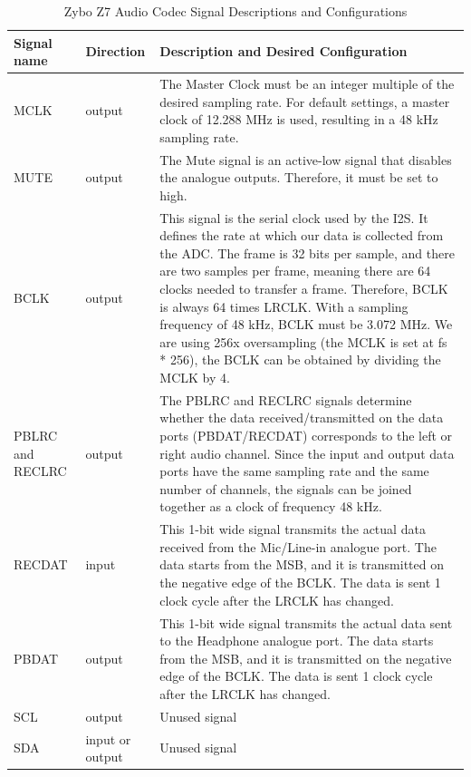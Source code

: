 \begin{table}
    \centering
    \begin{tabular}{|p{1.5cm}|p{1.5cm}|p{12cm}|}
        \hline
        \textbf{Signal name} & \textbf{Direction} & \textbf{Description and Desired Configuration} \\
        \hline
        MCLK & output & The Master Clock must be an integer multiple of the desired sampling rate. For default settings, a master clock of 12.288 MHz is used, resulting in a 48 kHz sampling rate. \\
        \hline
        MUTE & output & The Mute signal is an active-low signal that disables the analogue outputs. Therefore, it must be set to high. \\
        \hline
        BCLK & output & This signal is the serial clock used by the I2S. It defines the rate at which our data is collected from the ADC. The frame is 32 bits per sample, and there are two samples per frame, meaning there are 64 clocks needed to transfer a frame. Therefore, BCLK is always 64 times LRCLK. With a sampling frequency of 48 kHz, BCLK must be 3.072 MHz. We are using 256x oversampling (the MCLK is set at fs * 256), the BCLK can be obtained by dividing the MCLK by 4. \\
        \hline
        PBLRC and \mbox{RECLRC} & output & The PBLRC and RECLRC signals determine whether the data received/transmitted on the data ports (PBDAT/RECDAT) corresponds to the left or right audio channel. Since the input and output data ports have the same sampling rate and the same number of channels, the signals can be joined together as a clock of frequency 48 kHz. \\
        \hline
        RECDAT & input & This 1-bit wide signal transmits the actual data received from the Mic/Line-in analogue port. The data starts from the MSB, and it is transmitted on the negative edge of the BCLK. The data is sent 1 clock cycle after the LRCLK has changed. \\
        \hline
        PBDAT & output & This 1-bit wide signal transmits the actual data sent to the Headphone analogue port. The data starts from the MSB, and it is transmitted on the negative edge of the BCLK. The data is sent 1 clock cycle after the LRCLK has changed. \\
        \hline
        SCL & output & Unused signal \\
        \hline
        SDA & input or output & Unused signal \\
        \hline
    \end{tabular}
    \caption{Zybo Z7 Audio Codec Signal Descriptions and Configurations}
    \label{tab:Zybo-AC-signals}
\end{table}

